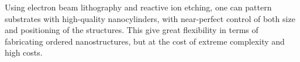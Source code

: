             \paragraph{}
        \subsubsection{}
                Using electron beam lithography and reactive ion etching, one can pattern substrates with high-quality nanocylinders, with near-perfect
            control of both size and positioning of the structures. This give great flexibility in terms of fabricating ordered nanostructures, but at the
            cost of extreme complexity and high costs.

\clearpage
